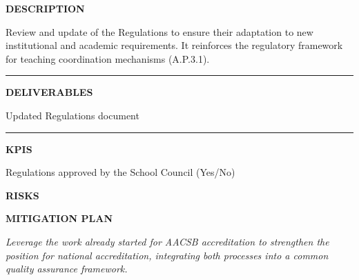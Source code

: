 \documentclass[11pt,a4paper]{scrreprt}
\newcommand{\fieldlabel}[1]{%
  {\footnotesize\sffamily\bfseries\color{mutedcolor}\MakeUppercase{#1}}\par\nopagebreak[4]
}
\newcommand{\fieldsep}{\vspace{3pt}\noindent\textcolor{bordercolor}{\rule{\linewidth}{0.4pt}}\vspace{3pt}\par}
\begin{document}
\begin{tcolorbox}[pabox={gobcolor}{A.P.1.2 \enspace\textbullet\enspace Review and Update of the School Regulations}]

\fieldlabel{Description}
{\small Review and update of the Regulations to ensure their adaptation to new institutional and academic requirements. It reinforces the regulatory framework for teaching coordination mechanisms (A.P.3.1).}\par
\fieldsep
\fieldlabel{Deliverables}
{\small Updated Regulations document}\par
\fieldsep
\fieldlabel{KPIs}
{\small Regulations approved by the School Council (Yes/No)}\par
\end{tcolorbox}
\begin{tcolorbox}[riskbox]
{\footnotesize\sffamily\bfseries\color{red!50!black} RISKS}\par{}
\end{tcolorbox}
\begin{tcolorbox}[mitbox]
{\footnotesize\sffamily\bfseries\color{green!40!black} MITIGATION PLAN}\par{}
\end{tcolorbox}
\vspace{8pt}

\newpage
{}
{\small\color{mutedcolor}\itshape Leverage the work already started for AACSB accreditation to strengthen the position for national accreditation, integrating both processes into a common quality assurance framework.}\par\vspace{6pt}
\end{document}
